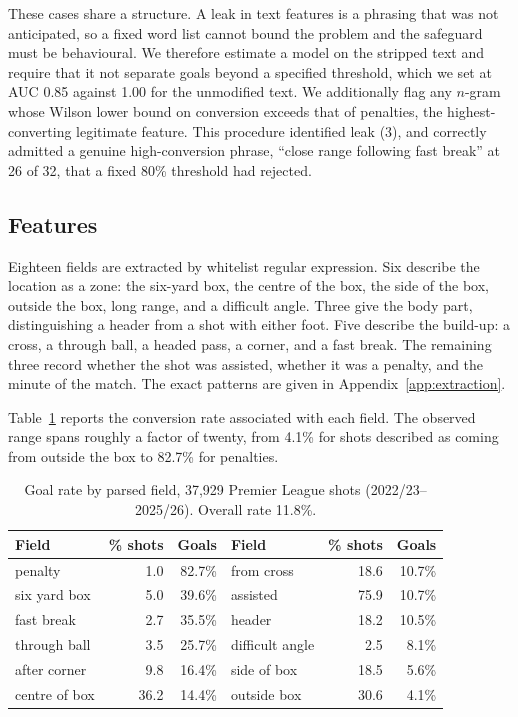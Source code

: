 \documentclass[conference]{IEEEtran}
\newcommand{\num}[1]{\mbox{#1}}
\begin{document}
These cases share a structure. A leak in text features is a phrasing that was
not anticipated, so a fixed word list cannot bound the problem and the
safeguard must be behavioural. We therefore estimate a model on the stripped
text and require that it not separate goals beyond a specified threshold, which
we set at AUC \num{0.85} against \num{1.00} for the unmodified text. We
additionally flag any $n$-gram whose Wilson lower bound on conversion exceeds
that of penalties, the highest-converting legitimate feature. This procedure
identified leak (3), and correctly admitted a genuine high-conversion phrase,
``close range following fast break'' at 26 of 32, that a fixed 80\% threshold
had rejected.

\subsection{Features}
\label{sec:features}

Eighteen fields are extracted by whitelist regular expression. Six describe
the location as a zone: the six-yard box, the centre of the box, the side of
the box, outside the box, long range, and a difficult angle. Three give the
body part, distinguishing a header from a shot with either foot. Five describe
the build-up: a cross, a through ball, a headed pass, a corner, and a fast
break. The remaining three record whether the shot was assisted, whether it
was a penalty, and the minute of the match. The exact patterns are given in
Appendix~\ref{app:extraction}.

Table~\ref{tab:signal} reports the conversion rate associated with each field.
The observed range spans roughly a factor of twenty, from 4.1\% for shots
described as coming from outside the box to 82.7\% for penalties.

\begin{table}[t]
\caption{Goal rate by parsed field, \num{37,929} Premier League shots
(2022/23--2025/26). Overall rate 11.8\%.}
\label{tab:signal}
\centering
\footnotesize
\begin{tabular}{lrr@{\hskip 0.9em}lrr}
\toprule
Field & \% shots & Goals & Field & \% shots & Goals \\
\midrule
penalty          & 1.0  & 82.7\% & from cross      & 18.6 & 10.7\% \\
six yard box     & 5.0  & 39.6\% & assisted        & 75.9 & 10.7\% \\
fast break       & 2.7  & 35.5\% & header          & 18.2 & 10.5\% \\
through ball     & 3.5  & 25.7\% & difficult angle & 2.5  & 8.1\%  \\
after corner     & 9.8  & 16.4\% & side of box     & 18.5 & 5.6\%  \\
centre of box    & 36.2 & 14.4\% & outside box     & 30.6 & 4.1\%  \\
\bottomrule
\end{tabular}
\end{table}
\end{document}
